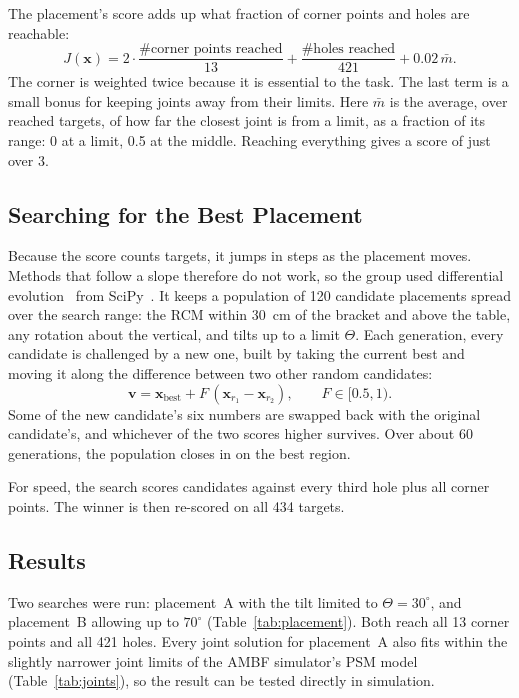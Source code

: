 The placement's score adds up what fraction of corner points and holes are
reachable:
\begin{equation}\label{eq:objective}
  J(\mathbf x)=
  2\cdot\frac{\#\text{corner points reached}}{13}
  +\frac{\#\text{holes reached}}{421}
  +0.02\,\bar m .
\end{equation}
The corner is weighted twice because it is essential to the task. The last
term is a small bonus for keeping joints away from their limits. Here
$\bar m$ is the average, over reached targets, of how far the closest joint
is from a limit, as a fraction of its range: 0 at a limit, 0.5 at the middle.
Reaching everything gives a score of just over 3.

\subsection{Searching for the Best Placement}\label{sec:search}
Because the score counts targets, it jumps in steps as the placement moves.
Methods that follow a slope therefore do not work, so the group used
differential evolution~\cite{storn1997de} from SciPy~\cite{virtanen2020scipy}.
It keeps a population of 120 candidate placements spread over the search
range: the RCM within \SI{30}{cm} of the bracket and above the table, any
rotation about the vertical, and tilts up to a limit $\Theta$. Each
generation, every candidate is challenged by a new one, built by taking the
current best and moving it along the difference between two other random
candidates:
\begin{equation}
  \mathbf v=\mathbf x_{\mathrm{best}}+F\,(\mathbf x_{r_1}-\mathbf x_{r_2}),
  \qquad F\in[0.5,1).
\end{equation}
Some of the new candidate's six numbers are swapped back with the original
candidate's, and whichever of the two scores higher survives. Over about 60
generations, the population closes in on the best region.

For speed, the search scores candidates against every third hole plus all
corner points. The winner is then re-scored on all 434 targets.

\subsection{Results}\label{sec:results}
Two searches were run: placement~A with the tilt limited to
$\Theta=30^\circ$, and placement~B allowing up to $70^\circ$
(Table~\ref{tab:placement}). Both reach all 13 corner points and all 421
holes. Every joint solution for placement~A also fits within the slightly
narrower joint limits of the AMBF simulator's PSM model
(Table~\ref{tab:joints}), so the result can be tested directly in
simulation.

